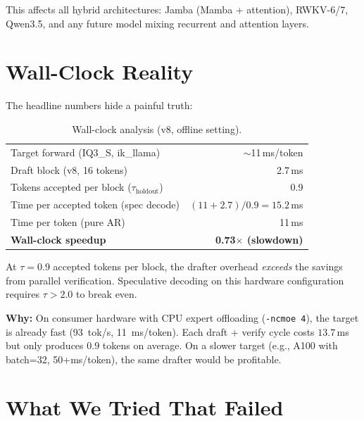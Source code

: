 \documentclass[10pt,a4paper]{article}
\begin{document}
This affects all hybrid architectures: Jamba (Mamba + attention), RWKV-6/7, Qwen3.5, and any future model mixing recurrent and attention layers.

\section{Wall-Clock Reality}
\label{sec:wallclock}

The headline numbers hide a painful truth:

\begin{table}[h]
\centering
\caption{Wall-clock analysis (v8, offline setting).}
\begin{tabular}{lr}
\toprule
Target forward (IQ3\_S, ik\_llama) & $\sim$11\,ms/token \\
Draft block (v8, 16 tokens) & 2.7\,ms \\
Tokens accepted per block ($\tau_\text{holdout}$) & 0.9 \\
Time per accepted token (spec decode) & $(11 + 2.7) / 0.9 = 15.2$\,ms \\
Time per token (pure AR) & 11\,ms \\
\textbf{Wall-clock speedup} & \textbf{0.73$\times$ (slowdown)} \\
\bottomrule
\end{tabular}
\end{table}

At $\tau{=}0.9$ accepted tokens per block, the drafter overhead \emph{exceeds} the savings from parallel verification. Speculative decoding on this hardware configuration requires $\tau{>}2.0$ to break even.

\textbf{Why:} On consumer hardware with CPU expert offloading (\texttt{-ncmoe 4}), the target is already fast (93~tok/s, 11~ms/token). Each draft + verify cycle costs $13.7$\,ms but only produces $0.9$ tokens on average. On a slower target (e.g., A100 with batch=32, 50+ms/token), the same drafter would be profitable.

\section{What We Tried That Failed}
\end{document}
